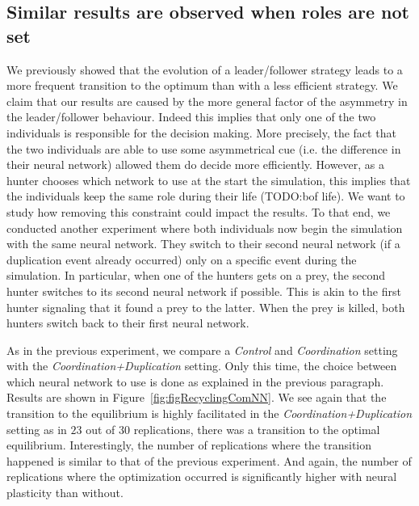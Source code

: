  \subsection{Similar results are observed when roles are not set}
    We previously showed that the evolution of a leader/follower strategy leads to a more frequent transition to the optimum than with a less efficient strategy. We claim that our results are caused by the more general factor of the asymmetry in the leader/follower behaviour. Indeed this implies that only one of the two individuals is responsible for the decision making. More precisely, the fact that the two individuals are able to use some asymmetrical cue (i.e. the difference in their neural network) allowed them do decide more efficiently. However, as a hunter chooses which network to use at the start the simulation, this implies that the individuals keep the same role during their life (TODO:bof life). We want to study how removing this constraint could impact the results. To that end, we conducted another experiment where both individuals now begin the simulation with the same neural network. They switch to their second neural network (if a duplication event already occurred) only on a specific event during the simulation. In particular, when one of the hunters gets on a prey, the second hunter switches to its second neural network if possible. This is akin to the first hunter signaling that it found a prey to the latter. When the prey is killed, both hunters switch back to their first neural network.

    As in the previous experiment, we compare a \emph{Control} and \emph{Coordination} setting with the \emph{Coordination+Duplication} setting. Only this time, the choice between which neural network to use is done as explained in the previous paragraph. Results are shown in Figure~\ref{fig:figRecyclingComNN}. We see again that the transition to the equilibrium is highly facilitated in the \emph{Coordination+Duplication} setting as in $23$ out of $30$ replications, there was a transition to the optimal equilibrium. Interestingly, the number of replications where the transition happened is similar to that of the previous experiment. And again, the number of replications where the optimization occurred is significantly higher with neural plasticity than without.

